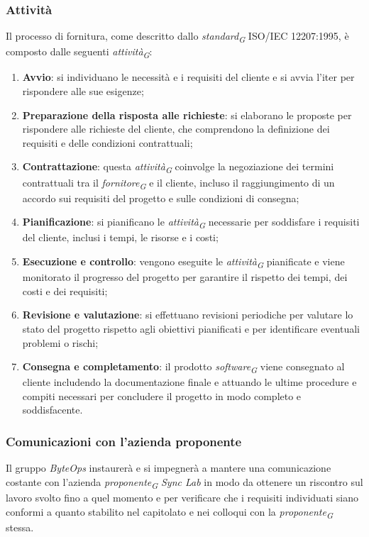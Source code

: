 \subsubsection{Attività}
Il processo di fornitura, come descritto dallo \textit{standard}\textsubscript{\textit{G}} ISO/IEC 12207:1995, è composto dalle seguenti \textit{attività}\textsubscript{\textit{G}}:
\begin{enumerate}
    \item \textbf{Avvio}: si individuano le necessità e i requisiti del cliente e si avvia l'iter per rispondere alle sue esigenze;
    \item \textbf{Preparazione della risposta alle richieste}: si elaborano le proposte per rispondere alle richieste del cliente, che comprendono la definizione dei requisiti e delle condizioni contrattuali;
    \item \textbf{Contrattazione}: questa \textit{attività}\textsubscript{\textit{G}} coinvolge la negoziazione dei termini contrattuali tra il \textit{fornitore}\textsubscript{\textit{G}} e il cliente, incluso il raggiungimento di un accordo sui requisiti del progetto e sulle condizioni di consegna;
    \item \textbf{Pianificazione}: si pianificano le \textit{attività}\textsubscript{\textit{G}} necessarie per soddisfare i requisiti del cliente, inclusi i tempi, le risorse e i costi;
    \item \textbf{Esecuzione e controllo}: vengono eseguite le \textit{attività}\textsubscript{\textit{G}} pianificate e viene monitorato il progresso del progetto per garantire il rispetto dei tempi, dei costi e dei requisiti;
    \item \textbf{Revisione e valutazione}:  si effettuano revisioni periodiche per valutare lo stato del progetto rispetto agli obiettivi pianificati e per identificare eventuali problemi o rischi;
    \item \textbf{Consegna e completamento}: il prodotto \textit{software}\textsubscript{\textit{G}} viene consegnato al cliente includendo la documentazione finale e attuando le ultime procedure e compiti necessari per concludere il progetto in modo completo e soddisfacente.
\end{enumerate}

\vspace{0.1cm}

\subsubsection{Comunicazioni con l'azienda proponente}
Il gruppo \textit{ByteOps} instaurerà e si impegnerà a mantere una comunicazione costante con l'azienda \textit{proponente}\textsubscript{\textit{G}} \textit{Sync Lab} in modo da ottenere un riscontro sul lavoro svolto fino a quel momento e per verificare che i requisiti individuati siano conformi a quanto stabilito nel capitolato e nei colloqui con la \textit{proponente}\textsubscript{\textit{G}} stessa.

